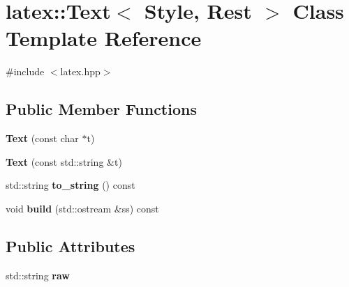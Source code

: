 \hypertarget{classlatex_1_1Text}{\section{latex\-:\-:\-Text$<$ \-Style, \-Rest $>$ \-Class \-Template \-Reference}
\label{classlatex_1_1Text}
}


{\ttfamily \#include $<$latex.\-hpp$>$}

\subsection*{\-Public \-Member \-Functions}
\begin{DoxyCompactItemize}
\item 
\hypertarget{classlatex_1_1Text_afe9f1b26a15e3d07ea75fb7d2fdc37bf}{{\bfseries \-Text} (const char $\ast$t)}\label{classlatex_1_1Text_afe9f1b26a15e3d07ea75fb7d2fdc37bf}

\item 
\hypertarget{classlatex_1_1Text_a617a65619f99319223508f56196f70a9}{{\bfseries \-Text} (const std\-::string \&t)}\label{classlatex_1_1Text_a617a65619f99319223508f56196f70a9}

\item 
\hypertarget{classlatex_1_1Text_ad89a6dfcc88b97508b361374b626e8f7}{std\-::string {\bfseries to\-\_\-string} () const }\label{classlatex_1_1Text_ad89a6dfcc88b97508b361374b626e8f7}

\item 
\hypertarget{classlatex_1_1Text_a5dcf86d02179aecc27f9fe02894e8c9e}{void {\bfseries build} (std\-::ostream \&ss) const }\label{classlatex_1_1Text_a5dcf86d02179aecc27f9fe02894e8c9e}

\end{DoxyCompactItemize}
\subsection*{\-Public \-Attributes}
\begin{DoxyCompactItemize}
\item 
\hypertarget{classlatex_1_1Text_a1411dbdc106553fcf930dcd3bcbb48f1}{std\-::string {\bfseries raw}}\label{classlatex_1_1Text_a1411dbdc106553fcf930dcd3bcbb48f1}

\end{DoxyCompactItemize}
